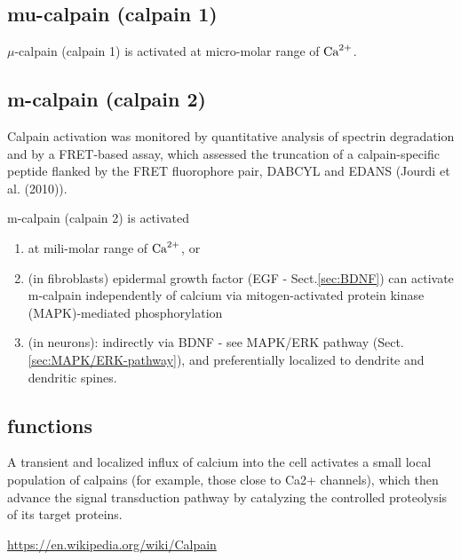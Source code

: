 \subsection{mu-calpain (calpain 1)}
\label{sec:mu-calpain}
\label{sec:calpain-1}

$\mu$-calpain (calpain 1) is activated at micro-molar range of ${\text{Ca}^{2+}}$.

\subsection{m-calpain (calpain 2)}
\label{sec:m-calpain}
\label{sec:calpain-2}


\begin{mdframed}

Calpain activation was monitored by quantitative analysis of spectrin
degradation and by a FRET-based assay, which assessed the truncation of a
calpain-specific peptide flanked by the FRET fluorophore pair, DABCYL and
EDANS (Jourdi et al. (2010)).
\end{mdframed}

m-calpain (calpain 2) is activated 
\begin{enumerate}
  
  \item at mili-molar range of  ${\text{Ca}^{2+}}$, or
  
  \item (in fibroblasts) epidermal growth factor (EGF - Sect.\ref{sec:BDNF}) can
  activate m-calpain independently of calcium via mitogen-activated protein kinase (MAPK)-mediated
  phosphorylation 

  \item (in neurons): indirectly via BDNF - see MAPK/ERK pathway
  (Sect.\ref{sec:MAPK/ERK-pathway}), and preferentially localized to dendrite
  and dendritic spines.
 
\end{enumerate}


\subsection{functions}

A transient and localized influx of calcium into the cell activates a small
local population of calpains (for example, those close to Ca2+ channels), which
then advance the signal transduction pathway by catalyzing the controlled
proteolysis of its target proteins.

\url{https://en.wikipedia.org/wiki/Calpain}







